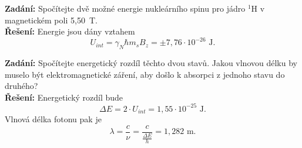 \begin{priklad}
\textbf{Zadání:} Spočítejte dvě možné energie nukleárního spinu pro jádro $^1$H v magnetickém poli 5,50~T.\\[0.1cm]
\textbf{Řešení:} Energie jsou dány vztahem
\begin{displaymath}
U_{int} = \gamma_N \hbar m_s B_z = \pm 7{,}76 \cdot 10^{-26} \mbox{ J}.
\end{displaymath}

\textbf{Zadání:} Spočítejte energetický rozdíl těchto dvou stavů. Jakou vlnovou délku by muselo být elektromagnetické záření, aby došlo k absorpci z jednoho stavu do druhého? \\[0.1cm]
\textbf{Řešení:} Energetický rozdíl bude
\begin{displaymath}
\Delta E = 2 \cdot U_{int} = 1{,}55 \cdot 10^{-25} \mbox{ J}.
\end{displaymath}
Vlnová délka fotonu pak je
\begin{displaymath}
\lambda = \frac{c}{\nu} = \frac{c}{\frac{\Delta E}{h}} = 1{,}282 \mbox{ m}.
\end{displaymath} \vspace{-0.5cm}
\end{priklad}
